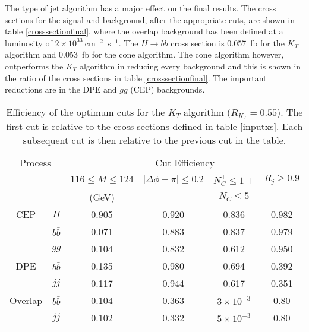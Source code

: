 The type of jet algorithm has a major effect on the final results. 
The cross sections for the signal and background, after the appropriate cuts, are shown in table \ref{crosssectionfinal}, where the overlap background has been defined at a luminosity of $2\times10^{33}~$cm$^{-2}$~s$^{-1}$.
The $H \rightarrow b\bar{b}$ cross section is 0.057~fb for the $K_T$ algorithm and 0.053~fb for the cone algorithm. The cone algorithm however, outperforms the $K_T$ algorithm in reducing every background and this is shown in the ratio of the cross sections in table \ref{crosssectionfinal}. The important reductions are in the DPE  and $gg$ (CEP) backgrounds. 


\begin{table}[t]
\centering
\begin{tabular}{|cc|c|c|c|c|}
\hline
\multicolumn{2}{|c|}{Process} & \multicolumn{4}{c|}{Cut Efficiency} \\
\cline{3-6}
& & $116\leq M \leq 124$ & $|\Delta \phi - \pi|  \leq 0.2 $ & $N_C^{\perp} \leq 1$ $+$ & $R_j\geq0.9$\\
& & (GeV) & & $N_C \leq 5$ & \\
\hline
CEP & $H$ & 0.905 & 0.920  & 0.836 & 0.982 \\ %
 & $b\bar{b}$ & 0.071 & 0.883 & 0.837 & 0.979 \\ 
 & $gg$ & 0.104 & 0.832 & 0.612 & 0.950\\ %
 \hline
DPE & $b\bar{b}$ & 0.135 & 0.980 & 0.694 & 0.392\\ %
 & $jj$ & 0.117 & 0.944 & 0.617 & 0.351 \\ %
\hline
Overlap & $b\bar{b}$ & 0.104 & 0.363 & $3\times10^{-3}$ &  0.80 \\ %
& $jj$ & 0.102 & 0.332 & $5\times10^{-3}$ & 0.80 \\ 
\hline
\end{tabular}
\caption[Efficiency of cuts for the $K_T$ algorithm]{Efficiency of the optimum cuts for the $K_T$ algorithm ($R_{K_T}=0.55$). The first cut is relative to the cross sections defined in table \ref{inputxs}. Each subsequent cut is then relative to the previous cut in the table. \label{ktcuteff}}
\end{table}%



